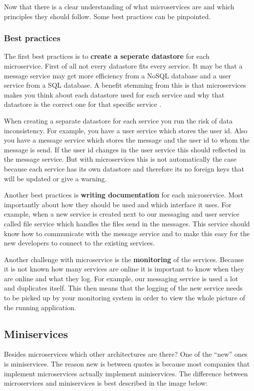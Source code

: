 Now that there is a clear understanding of what microservices are and which principles
they should follow. Some best practices can be pinpointed.

\subsubsection{Best practices}
The first best practices is to \textbf{create a seperate datastore} for each microservice. First of all not every datastore fits every service. It may be that a message service may get more efficiency from a NoSQL database and a user service from a SQL database. A benefit stemming from this is that microservices makes you think about each datastore used for each service and why that datastore is the correct one for that specific service \cite{microservicesNetflix}.

When creating a separate datastore for each service you run the risk of data inconsistency. For example, you have a user service which stores the user id. Also you have a message service which stores the message and the user id to whom the message is send. If the user id changes in the user service this should reflected in the message service. But with microservices this is not automatically the case because each service has its own datastore and therefore its no foreign keys that will be updated or give a warning.

Another best practices is \textbf{writing documentation} \cite{microservicesBestPractice} for each microservice. Most importantly about how they should be used and which interface it uses. For example, when a new service is created next to our messaging and user service called file service which handles the files send in the messages. This service should know how to communicate with the message service and to make this easy for the new developers to connect to the existing services.

Another challenge with microservice is the \textbf{monitoring} \cite{microservicesBestPractice} of the services. Because it is not known how many services are online it is important to know when they are online and what they log. For example, our messaging service is used a lot and duplicates itself. This then means that the logging of the new service needs to be picked up by your monitoring system in order to view the whole picture of the running application.

\subsection{Miniservices}
Besides microservices which other architectures are there? One of the “new” ones is miniservices. The reason new is between quotes is because most companies that implement microservices actually implement miniservices. The difference between microservices and miniservices is best described in the image below:

